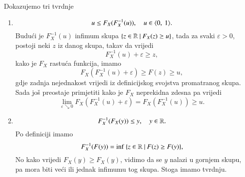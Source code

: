 \begin{rj}[\ref{zad:5.13-1}]
    Dokazujemo tri tvrdnje
    \begin{enumerate}[label=(\arabic*)]
        \item \label{zad:5.13-1.1}
        \begin{equation*}
            u \leq F_X ( F_X^{-1} ( u )), \quad u \in \langle {0}, \: {1} \rangle.
        \end{equation*}
        Budu\' ci je $F_X^{-1} (u)$ infimum skupa $\{{z \in \mathbb{R}} \: | \: {F_X (z) \geq u}\}$, tada za svaki $\varepsilon > 0$, postoji neki $z$ iz danog skupa, takav da vrijedi
        \begin{equation*}
            F_X^{-1} (u) + \varepsilon \geq z,
        \end{equation*}
        kako je $F_X$ rastu\' ca funkcija, imamo
        \begin{equation*}
            F_X (F_X^{-1} (u) + \varepsilon) \geq F(z) \geq u,
        \end{equation*}
        gdje zadnja nejednakost vrijedi iz definicijskog svojstva promatranog skupa.
        Sada jo\v s preostaje primjetiti kako je $F_X$ neprekidna zdesna pa vrijedi
        \begin{equation*}
            \lim\limits_{\varepsilon \searrow 0} F_X ( F_X^{-1} (u) + \varepsilon) = F_X (F_X^{-1} (u)) \geq u. 
        \end{equation*}

        \item   \label{zad:5.13-1.2}
        \begin{equation*}
            F_X^{-1} (F_X (y)) \leq y, \quad y \in \mathbb{R}.
        \end{equation*}
        Po definiciji imamo
        \begin{equation*}
            F_X^{-1} (F(y)) = \inf \: \{{z \in \mathbb{R}} \: | \: {F(z) \geq F(y)}\},
        \end{equation*}
        No kako vrijedi $F_X (y) \geq F_X (y)$, vidimo da se $y$ nalazi u gornjem skupu, pa mora biti ve\' ci ili jednak infimumu tog skupa.
        Stoga imamo tvrdnju.


\end{enumerate}
\end{rj}
